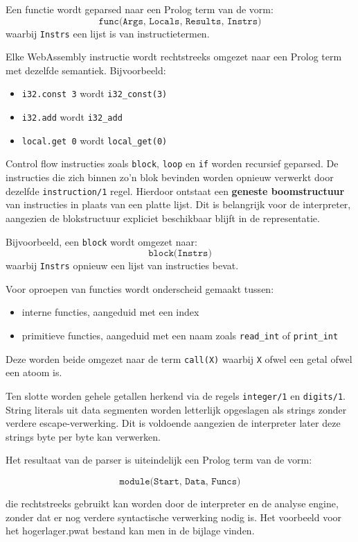 \documentclass[a4paper,11pt]{article}
\begin{document}
Een functie wordt geparsed naar een Prolog term van de vorm:
\[
\texttt{func(Args, Locals, Results, Instrs)}
\]
waarbij \texttt{Instrs} een lijst is van instructietermen.

Elke WebAssembly instructie wordt rechtstreeks omgezet naar een Prolog term met dezelfde semantiek. Bijvoorbeeld:
\begin{itemize}
    \item \texttt{i32.const 3} wordt \texttt{i32\_const(3)}
    \item \texttt{i32.add} wordt \texttt{i32\_add}
    \item \texttt{local.get 0} wordt \texttt{local\_get(0)}
\end{itemize}

Control flow instructies zoals \texttt{block}, \texttt{loop} en \texttt{if} worden recursief geparsed. De instructies die zich binnen zo'n blok bevinden worden opnieuw
verwerkt door dezelfde \texttt{instruction/1} regel. Hierdoor ontstaat een \textbf{geneste boomstructuur} van instructies in plaats van een platte lijst.
Dit is belangrijk voor de interpreter, aangezien de blokstructuur expliciet beschikbaar blijft in de representatie.

Bijvoorbeeld, een \texttt{block} wordt omgezet naar:
\[
\texttt{block(Instrs)}
\]
waarbij \texttt{Instrs} opnieuw een lijst van instructies bevat.

Voor oproepen van functies wordt onderscheid gemaakt tussen:
\begin{itemize}
    \item interne functies, aangeduid met een index
    \item primitieve functies, aangeduid met een naam zoals \texttt{read\_int} of \texttt{print\_int}
\end{itemize}

Deze worden beide omgezet naar de term \texttt{call(X)} waarbij \texttt{X} ofwel een getal ofwel een atoom is.

Ten slotte worden gehele getallen herkend via de regels \texttt{integer/1} en \texttt{digits/1}. String literals uit data segmenten worden letterlijk
opgeslagen als strings zonder verdere escape-verwerking.
Dit is voldoende aangezien de interpreter later deze strings byte per byte kan verwerken.

Het resultaat van de parser is uiteindelijk een Prolog term van de vorm:

\[
\texttt{module(Start, Data, Funcs)}
\]

die rechtstreeks gebruikt kan worden door de interpreter en de analyse engine, zonder dat er nog verdere syntactische verwerking nodig is.
Het voorbeeld voor het hogerlager.pwat bestand kan men in de bijlage vinden.
\end{document}
